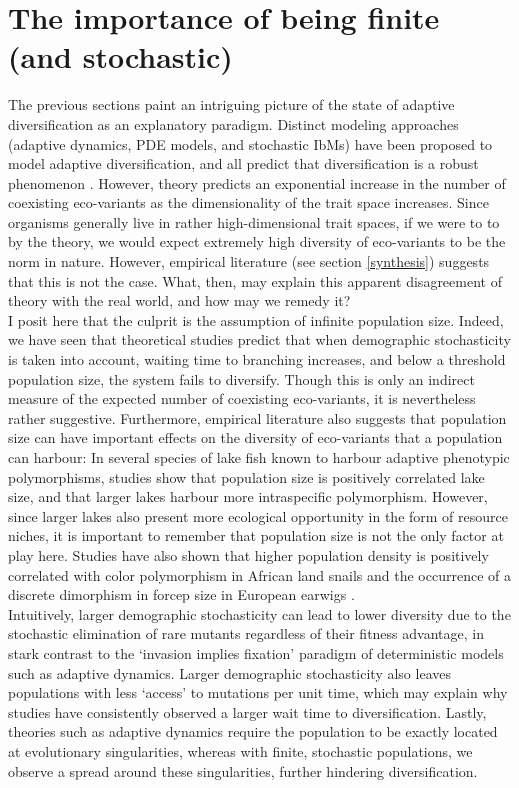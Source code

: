 \section{The importance of being finite (and stochastic)}\label{goals}
The previous sections paint an intriguing picture of the state of adaptive diversification as an explanatory paradigm. Distinct modeling approaches (adaptive dynamics, PDE models, and stochastic IbMs) have been proposed to model adaptive diversification, and all predict that diversification is a robust phenomenon \citep{doebeli_adaptive_2011}. However, theory predicts an exponential increase in the number of coexisting eco-variants as the dimensionality of the trait space increases. Since organisms generally live in rather high-dimensional trait spaces, if we were to to by the theory, we would expect extremely high diversity of eco-variants to be the norm in nature. However, empirical literature (see section \ref{synthesis}) suggests that this is not the case. What, then, may explain this apparent disagreement of theory with the real world, and how may we remedy it?\\
I posit here that the culprit is the assumption of infinite population size. Indeed, we have seen that theoretical studies predict that when demographic stochasticity is taken into account, waiting time to branching increases, and below a threshold population size, the system fails to diversify. Though this is only an indirect measure of the expected number of coexisting eco-variants, it is nevertheless rather suggestive. Furthermore, empirical literature also suggests that population size can have important effects on the diversity of eco-variants that a population can harbour: In several species of lake fish known to harbour adaptive phenotypic polymorphisms, studies \citep{claessen_effect_2008,recknagel_crater_2014,recknagel_ecosystem_2017} show that population size is positively correlated lake size, and that larger lakes harbour more intraspecific polymorphism. However, since larger lakes also present more ecological opportunity in the form of resource niches, it is important to remember that population size is not the only factor at play here. Studies have also shown that higher population density is positively correlated with color polymorphism in African land snails \citep{owen_polymorphism_1963} and the occurrence of a discrete dimorphism in forcep size in European earwigs \citep{tomkins_population_2004}.\\
Intuitively, larger demographic stochasticity can lead to lower diversity due to the stochastic elimination of rare mutants regardless of their fitness advantage, in stark contrast to the `invasion implies fixation' paradigm of deterministic models such as adaptive dynamics. Larger demographic stochasticity also leaves populations with less `access' to mutations per unit time, which may explain why studies have consistently observed a larger wait time to diversification. Lastly, theories such as adaptive dynamics require the population to be exactly located at evolutionary singularities, whereas with finite, stochastic populations, we observe a spread around these singularities, further hindering diversification.\\
